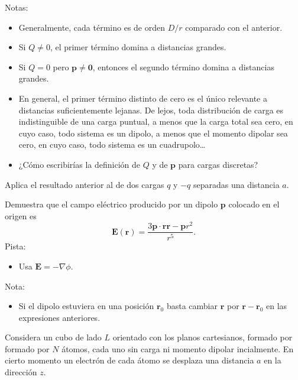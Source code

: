 \documentclass{exam}
\begin{document}
\begin{questions}
  Notas:
  \begin{itemize}
  \item Generalmente, cada término es de orden $D/r$ comparado con el
    anterior.
  \item Si $Q\ne 0$, el primer término domina a distancias grandes.
  \item Si $Q=0$ pero $\bm p\ne \bm 0$, entonces el segundo término
    domina a distancias grandes.
  \item En general, el primer término distinto de cero es el único
    relevante a distancias suficientemente lejanas. De lejos, toda
    distribución de carga es indistinguible de una carga puntual, a
    menos que la carga total sea cero, en cuyo caso, todo sistema es
    un dipolo, a menos que el momento dipolar sea cero, en cuyo caso,
    todo sistema es un cuadrupolo\ldots
  \item ¿Cómo escribirías la definición de $Q$ y de $\bm p$ para cargas
    discretas?
  \end{itemize}

  \question Aplica el resultado anterior al de dos cargas $q$ y $-q$
  separadas una distancia $a$.

  \question Demuestra que el campo eléctrico producido por un dipolo
  $\bm p$ colocado en el origen es
  $$
  \bm E(\bm r)=\frac{3\bm p\cdot\bm r\bm r-\bm p r^2}{r^5}.
  $$
  Pista:
  \begin{itemize}
  \item Usa $\bm E= -\nabla\phi$.
  \end{itemize}
  Nota:
  \begin{itemize}
  \item Si el dipolo estuviera en una posición $\bm r_0$ basta cambiar
    $\bm r$ por $\bm r-\bm r_0$ en las expresiones anteriores.
  \end{itemize}

  \question Considera un cubo de lado $L$ orientado con los planos
  cartesianos, formado por formado por $N$ átomos, cada uno sin carga
  ni momento dipolar incialmente. En cierto momento un electrón de
  cada átomo se desplaza una distancia $a$ en la dirección $z$.
\end{questions}
\end{document}
